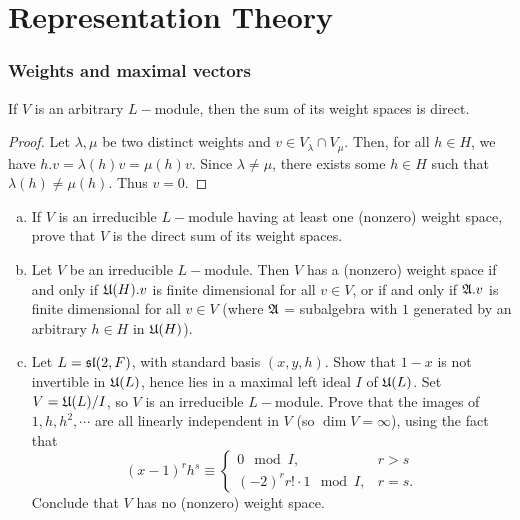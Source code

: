 \part{Representation Theory}
\section{Weights and maximal vectors}
\begin{ex}
	If $V$ is an arbitrary $L-$module, then the sum of its weight spaces is direct.
\end{ex}
\begin{proof}
	Let $\lambda,\mu$ be two distinct weights and $v\in V_{\lambda}\cap V_{\mu}$. Then, for all $h\in H$, we have $h.v=\lambda(h)v=\mu(h)v$. Since $\lambda\neq\mu$, there exists some $h\in H$ such that $\lambda(h)\neq\mu(h)$. Thus $v=0$.
\end{proof}
\begin{ex}
	\begin{enumerate}[(a)]
		\item If $V$ is an irreducible $L-$module having at least one (nonzero) weight space, prove that $V$ is the direct sum of its weight spaces.
		\item Let $V$ be an irreducible $L-$module. Then $V$ has a (nonzero) weight space if and only if $\UUu(H).v$ is finite dimensional for all $v\in V$, or if and only if $\AAa.v$ is finite dimensional for all $v\in V$ (where $\AAa$ = subalgebra with $1$ generated by an arbitrary $h\in H$ in $\UUu(H)$).
		\item Let $L = \sl(2, F)$, with standard basis $(x, y, h)$. Show that $1-x$ is not invertible in $\UUu(L)$, hence lies in a maximal left ideal $I$ of $\UUu(L)$. Set $V = \UUu(L)/I$, so $V$ is an irreducible $L-$module. Prove that the images of $1, h, h^2, \cdots$ are all linearly independent in $V$ (so $\dim V = \infty$), using the fact that
		\[
		(x-1)^rh^s \equiv 
		\begin{cases}
		0\mod I, & r>s \\
		(-2)^rr!\cdot1 \mod I, & r=s.
		\end{cases}
		\]
		Conclude that $V$ has no (nonzero) weight space.
	\end{enumerate}
\end{ex}
